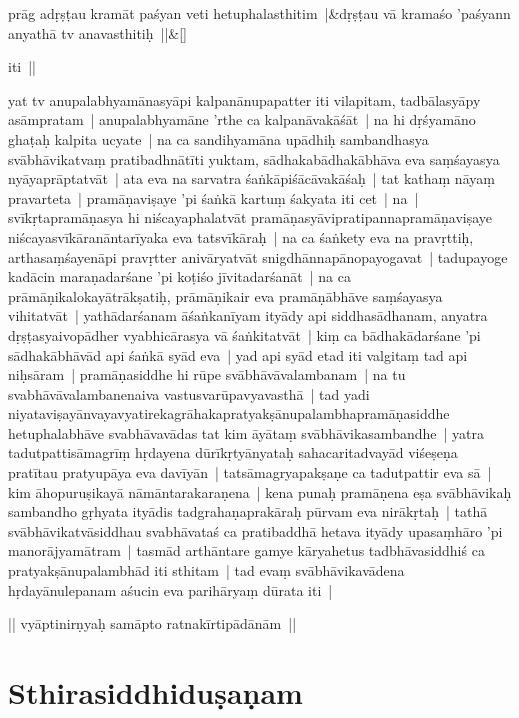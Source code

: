 \documentclass[article,12pt,a4paper]{memoir}
\begin{document}
	\pend
      
	    
	    \stanza[\smallbreak]
	prāg adṛṣṭau kramāt paśyan veti hetuphalasthitim |&dṛṣṭau vā kramaśo 'paśyann anyathā tv anavasthitiḥ ||\&[\smallbreak]


	

	  \pstart iti ||
	\pend
      

	  \pstart yat tv anupalabhyamānasyāpi kalpanānupapatter iti vilapitam, tadbālasyāpy asāmpratam | anupalabhyamāne 'rthe ca kalpanāvakāśāt | na hi dṛśyamāno ghaṭaḥ kalpita ucyate | na ca sandihyamāna upādhiḥ sambandhasya svābhāvikatvaṃ pratibadhnātīti yuktam, sādhakabādhakābhāva eva saṃśayasya nyāyaprāptatvāt | ata eva na sarvatra śaṅkāpiśācāvakāśaḥ | tat kathaṃ nāyaṃ pravarteta | \label{thakur75-111.9} pramāṇaviṣaye 'pi śaṅkā kartuṃ śakyata iti cet | na | svīkṛtapramāṇasya hi niścayaphalatvāt pramāṇasyāvipratipannapramāṇaviṣaye niścayasvīkāranāntarīyaka eva tatsvīkāraḥ | na ca śaṅkety eva na pravṛttiḥ, arthasaṃśayenāpi pravṛtter anivāryatvāt snigdhānnapānopayogavat | tadupayoge kadācin maraṇadarśane 'pi koṭiśo jīvitadarśanāt | na ca prāmāṇikalokayātrākṣatiḥ, prāmāṇikair eva pramāṇābhāve saṃśayasya vihitatvāt | yathādarśanam āśaṅkanīyam ityādy api siddhasādhanam, anyatra dṛṣṭasyaivopādher vyabhicārasya vā śaṅkitatvāt | kiṃ ca bādhakādarśane 'pi sādhakābhāvād api śaṅkā syād eva | \label{thakur75-111.17} yad api syād etad iti valgitaṃ tad api niḥsāram | pramāṇasiddhe hi rūpe svābhāvāvalambanam | na tu svabhāvāvalambanenaiva vastusvarūpavyavasthā | tad yadi niyataviṣayānvayavyatirekagrāhakapratyakṣānupalambhapramāṇasiddhe hetuphalabhāve svabhāvavādas tat kim āyātaṃ svābhāvikasambandhe | yatra tadutpattisāmagrīṃ hṛdayena dūrīkṛtyānyataḥ sahacaritadvayād viśeṣeṇa pratītau pratyupāya eva davīyān | tatsāmagryapakṣaṇe ca tadutpattir eva sā | kim āhopuruṣikayā nāmāntarakaraṇena | kena punaḥ pramāṇena eṣa svābhāvikaḥ sambandho gṛhyata ityādis tadgrahaṇaprakāraḥ pūrvam eva nirākṛtaḥ | tathā svābhāvikatvāsiddhau svabhāvataś ca pratibaddhā hetava ityādy upasaṃhāro 'pi manorājyamātram | tasmād arthāntare gamye kāryahetus tadbhāvasiddhiś ca pratyakṣānupalambhād iti sthitam | tad evaṃ svābhāvikavādena hṛdayānulepanam aśucin eva parihāryaṃ dūrata iti |
	\pend
      

	  \pstart || vyāptinirṇyaḥ samāpto ratnakīrtipādānām || 
	\pend
      
	  
	
\section[{Sthirasiddhiduṣaṇam}]{Sthirasiddhiduṣaṇam}\label{Sthirasiddhiduṣaṇam}
\end{document}
